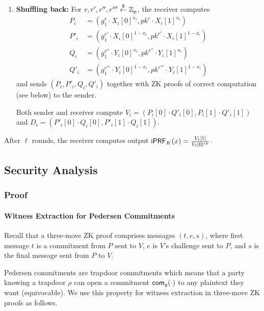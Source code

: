 \begin{enumerate}
\item {\bf Shuffling back:}
  For $r,r',r'',r'''\stackrel{\$}{\leftarrow}\mathbb{Z}_p$, the receiver computes
  \begin{align*}
    P_i&=(g_1^r\cdot{}X_i[0]^{x_i},pk^r\cdot{}X_i[1]^{x_i})
    \\P'_i&=(g_1^{r'}\cdot{}X_i[0]^{1-x_i},pk^{r'}\cdot{}X_i[1]^{1-x_i})
   \\Q_i&=(g_1^{r''}\cdot{}Y_i[0]^{x_i},pk^{r''}\cdot{}Y_i[1]^{x_i})
   \\Q'_i&=(g_1^{r'''}\cdot{}Y_i[0]^{1-x_i},pk^{r'''}\cdot{}Y_i[1]^{1-x_i})
  \end{align*} 
  and sends $(P_i,P'_i,Q_i,Q'_i)$ together with ZK proofs of correct
  computation (see below) to the sender.

  Both sender and receiver compute
  $V_i=(P_i[0]\cdot{}Q'_i[0],P_i[1]\cdot{}Q'_i[1])$ and
  $D_i=(P'_i[0]\cdot{}Q_i[0],P'_i[1]\cdot{}Q_i[1])$.
  
\end{enumerate}

After $\ell$ rounds, the receiver computes output
$\mathsf{i}\mathsf{PRF}_K(x)=\frac{V_\ell[1]}{V_{\ell}[0]^{sk}}$.


\subsection{Security Analysis}
 
\subsubsection{Proof}

\paragraph{Witness Extraction for Pedersen Commitments}
Recall that a three-move ZK proof comprises messages $(t,e,s)$, where
first message $t$ is a commitment from $P$ sent to $V$, $e$ is $V$'s
challenge sent to $P$, and $s$ is the final message sent from $P$ to
$V$.

Pedersen commitments are trapdoor commitments which means that a party
knowing a trapdoor $\rho$ can open a commitment $\mathsf{com}_g(\cdot)$ to any
plaintext they want (equivocable).  We use this property for witness
extraction in three-move ZK proofs as follows.

